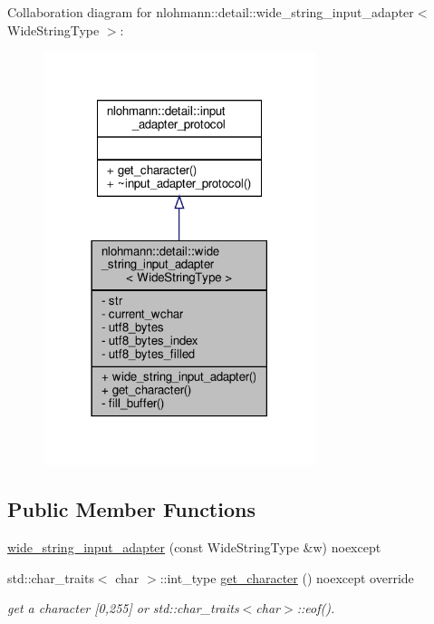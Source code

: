 Collaboration diagram for nlohmann\+:\+:detail\+:\+:wide\+\_\+string\+\_\+input\+\_\+adapter$<$ Wide\+String\+Type $>$\+:
\nopagebreak
\begin{figure}[H]
\begin{center}
\leavevmode
\includegraphics[width=225pt]{classnlohmann_1_1detail_1_1wide__string__input__adapter__coll__graph}
\end{center}
\end{figure}
\subsection*{Public Member Functions}
\begin{DoxyCompactItemize}
\item 
\hyperlink{classnlohmann_1_1detail_1_1wide__string__input__adapter_a85c8bddae20bc00d64dd7a2c87109357}{wide\+\_\+string\+\_\+input\+\_\+adapter} (const Wide\+String\+Type \&w) noexcept
\item 
std\+::char\+\_\+traits$<$ char $>$\+::int\+\_\+type \hyperlink{classnlohmann_1_1detail_1_1wide__string__input__adapter_abb62b34cf77e557ce5321b7f2490c3b0}{get\+\_\+character} () noexcept override
\begin{DoxyCompactList}\small\item\em get a character \mbox{[}0,255\mbox{]} or std\+::char\+\_\+traits$<$char$>$\+::eof(). \end{DoxyCompactList}\end{DoxyCompactItemize}
